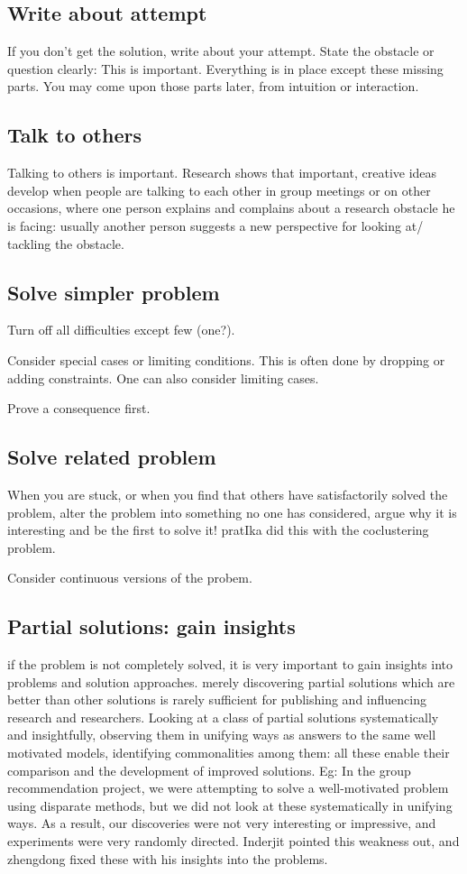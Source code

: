 \documentclass[oneside, article]{memoir}
\begin{document}
\subsection{Write about attempt}
If you don't get the solution, write about your attempt. State the obstacle or question clearly: This is important. Everything is in place except these missing parts. You may come upon those parts later, from intuition or interaction.

\subsection{Talk to others}
Talking to others is important. Research shows that important, creative ideas develop when people are talking to each other in group meetings or on other occasions, where one person explains and complains about a research obstacle he is facing: usually another person suggests a new perspective for looking at/ tackling the obstacle.

\subsection{Solve simpler problem}
Turn off all difficulties except few (one?).

Consider special cases or limiting conditions. This is often done by dropping or adding constraints. One can also consider limiting cases.

Prove a consequence first.

\subsection{Solve related problem}
When you are stuck, or when you find that others have satisfactorily solved the problem, alter the problem into something no one has considered, argue why it is interesting and be the first to solve it! pratIka did this with the coclustering problem.

Consider continuous versions of the probem.

\subsection{Partial solutions: gain insights}
if the problem is not completely solved, it is very important to gain insights into problems and solution approaches. merely discovering partial solutions which are better than other solutions is rarely sufficient for publishing and influencing research and researchers. Looking at a class of partial solutions systematically and insightfully, observing them in unifying ways as answers to the same well motivated models, identifying commonalities among them: all these enable their comparison and the development of improved solutions. Eg: In the group recommendation project, we were attempting to solve a well-motivated problem using disparate methods, but we did not look at these systematically in unifying ways. As a result, our discoveries were not very interesting or impressive, and experiments were very randomly directed. Inderjit pointed this weakness out, and zhengdong fixed these with his insights into the problems.
\end{document}
